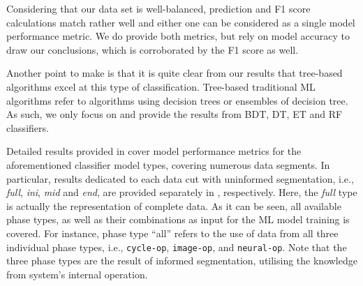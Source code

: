 Considering that our data set is well-balanced, prediction and F1 score calculations match rather well and either one can be considered as a single model performance metric. We do provide both metrics, but rely on model accuracy to draw our conclusions, which is corroborated by the F1 score as well.

Another point to make is that it is quite clear from our results that tree-based algorithms excel at this type of classification. Tree-based traditional ML algorithms refer to algorithms using decision trees or ensembles of decision tree. As such, we only focus on and provide the results from BDT, DT, ET and RF classifiers.

Detailed results provided in  cover model performance metrics for the aforementioned classifier model types, covering numerous data segments. In particular, results dedicated to each data cut with uninformed segmentation, i.e., \emph{full}, \emph{ini}, \emph{mid} and \emph{end}, are provided separately in , respectively. Here, the \emph{full} type is actually the representation of complete data. As it can be seen, all available phase types, as well as their combinations as input for the ML model training is covered. For instance, phase type \enquote{all} refers to the use of data from all three individual phase types, i.e., \texttt{cycle-op}, \texttt{image-op}, and \texttt{neural-op}. Note that the three phase types are the result of informed segmentation, utilising the knowledge from system's internal operation.
%
